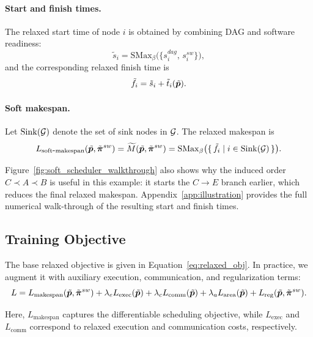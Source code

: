 \paragraph{\textbf{Start and finish times.}}
The relaxed start time of node $i$ is obtained by combining DAG and software readiness:
\begin{equation}
\tilde{s}_i=\mathrm{SMax}_{\beta}\big(\{s_i^{dag},\,s_i^{sw}\}\big),
\end{equation}
and the corresponding relaxed finish time is
\begin{equation}
\tilde{f}_i=\tilde{s}_i+\tilde{t}_i(\tilde{{\bm{p}}}).
\end{equation}

\paragraph{\textbf{Soft makespan.}}
Let $\operatorname{Sink}({\mathcal{G}})$ denote the set of sink nodes in ${\mathcal{G}}$. The relaxed makespan is
\begin{equation}
L_{\mathrm{soft\mbox{-}makespan}}(\tilde{{\bm{p}}},\tilde{\bm{\pi}}^{sw})
=
\widetilde{M}(\tilde{{\bm{p}}},\tilde{\bm{\pi}}^{sw})
=
\mathrm{SMax}_{\beta}\big(\{\, \tilde{f}_i \mid i \in \operatorname{Sink}({\mathcal{G}})\,\}\big).
\end{equation}

Figure~\ref{fig:soft_scheduler_walkthrough} also shows why the induced order $C\prec A\prec B$ is useful in this example: it starts the $C\!\rightarrow\!E$ branch earlier, which reduces the final relaxed makespan. Appendix~\ref{app:illustration} provides the full numerical walk-through of the resulting start and finish times.

\subsection{Training Objective}

The base relaxed objective is given in Equation~\eqref{eq:relaxed_obj}. In practice, we augment it with auxiliary execution, communication, and regularization terms:
\begin{equation}
L
=
L_{\mathrm{makespan}}(\tilde{{\bm{p}}},\tilde{\bm{\pi}}^{sw})
+
\lambda_e L_{\mathrm{exec}}(\tilde{{\bm{p}}})
+
\lambda_c L_{\mathrm{comm}}(\tilde{{\bm{p}}})
+
\lambda_a L_{\mathrm{area}}(\tilde{{\bm{p}}})
+
L_{\mathrm{reg}}(\tilde{{\bm{p}}},\tilde{\bm{\pi}}^{sw}).
\end{equation}

Here, $L_{\mathrm{makespan}}$ captures the differentiable scheduling objective, while $L_{\mathrm{exec}}$ and $L_{\mathrm{comm}}$ correspond to relaxed execution and communication costs, respectively.

